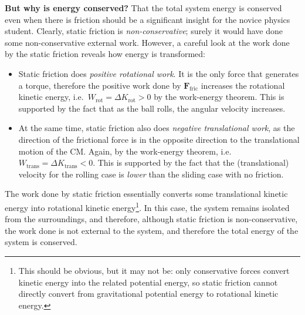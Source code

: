 \textbf{But why is energy conserved?} That the total system energy is conserved
even when there is friction should be a significant insight for the novice
physics student. Clearly, static friction is \emph{non-conservative}; surely it
would have done some non-conservative external work. However, a careful look at
the work done by the static friction reveals how energy is transformed:
\begin{itemize}[itemsep=6pt]
\item Static friction does \emph{positive rotational work}. It is the only
  force that generates a torque, therefore the positive work done by
  $\bm F_\text{fric}$ increases the rotational kinetic energy, i.e.\
  $W_\text{rot}=\Delta K_\text{rot}>0$ by the work-energy theorem. This is
  supported by the fact that as the ball rolls, the  angular velocity increases.
\item At the same time, static friction also does \emph{negative translational
  work}, as the direction of the frictional force is in the opposite direction
  to the translational motion of the CM. Again, by the
  work-energy theorem, i.e.\ $W_\text{trans}=\Delta K_\text{trans}<0$. This is
  supported by the fact
  that the (translational) velocity for the rolling case is \emph{lower} than
  the sliding case with no friction.
\end{itemize}
The work done by static friction essentially converts some translational kinetic
energy into rotational kinetic energy\footnote{This should be obvious, but it
may not be: only conservative forces convert kinetic energy into the related
potential energy, so static friction cannot directly convert from gravitational
potential energy to rotational kinetic energy.}. In this case, the system
remains isolated from the surroundings, and therefore, although static friction
is non-conservative, the work done is not external to the system, and therefore
the total energy of the system is conserved.


